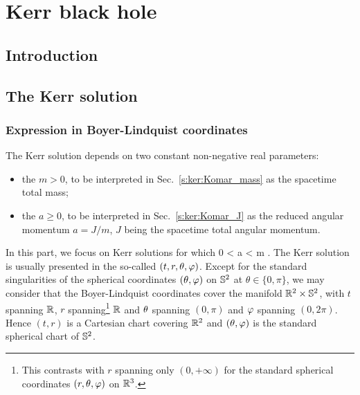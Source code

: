 \chapter{Kerr black hole}
\label{s:ker}

\minitoc

\section{Introduction}

\section{The Kerr solution}

\subsection{Expression in Boyer-Lindquist coordinates} \label{s:ker:expr_BL}

The Kerr solution depends on two constant non-negative real parameters:
\begin{itemize}
\item the  $m > 0$, to be
interpreted in Sec.~\ref{s:ker:Komar_mass} as the spacetime total mass;
\item the  $a \geq 0 $,
to be interpreted in Sec.~\ref{s:ker:Komar_J} as the reduced angular momentum  $a=J/m$, $J$ being the
spacetime total angular momentum.
\end{itemize}
In this part, we focus on Kerr solutions for which
\be \label{e:ker:a_lower_m}
    0 < a < m .
\ee
The Kerr solution is usually presented in the so-called
$(t,r,\theta,\varphi)$. Except for the standard singularities of the
spherical coordinates $(\theta,\varphi)$ on $\mathbb{S}^2$ at $\theta\in\{0,\pi\}$,
we may consider that the Boyer-Lindquist coordinates cover the manifold
$\mathbb{R}^2\times\mathbb{S}^2$, with $t$ spanning $\mathbb{R}$, $r$
spanning\footnote{This contrasts with $r$ spanning only $(0,+\infty)$ for
the standard spherical coordinates $(r,\theta,\varphi)$ on $\mathbb{R}^3$.} $\mathbb{R}$ and
$\theta$ spanning $(0,\pi)$ and $\varphi$ spanning $(0,2\pi)$. Hence
$(t,r)$ is a Cartesian chart covering $\mathbb{R}^2$ and $(\theta,\varphi)$ is the standard
spherical chart of $\mathbb{S}^2$.

